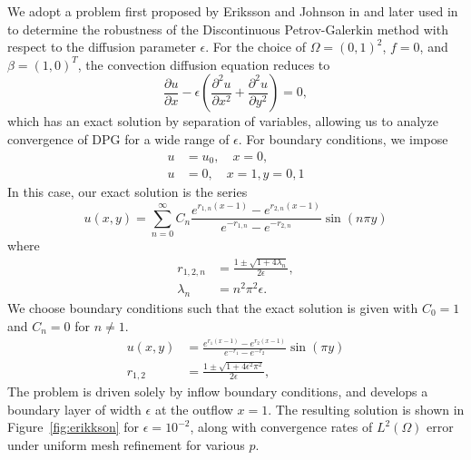 \documentclass[final,leqno]{siamltex}
\newcommand{\LRp}[1]{\left( #1 \right)}
\renewcommand{\L}{L^2\LRp{\Omega}}
\newcommand{\pd}[2]{\frac{\partial#1}{\partial#2}}
\newcommand{\pdd}[2]{\frac{\partial^2#1}{\partial#2^2}}
\begin{document}
We adopt a problem first proposed by Eriksson and Johnson in \cite{Eriksson1993} and later used in \cite{DPGrobustness, DPGrobustness2} to determine the robustness of the Discontinuous Petrov-Galerkin method with respect to the diffusion parameter $\epsilon$. For the choice of $\Omega = (0,1)^2$, $f=0$, and $\beta = (1,0)^T$, the convection diffusion equation reduces to
\[
\pd{u}{x} - \epsilon \left(\pdd{u}{x}+ \pdd{u}{y}\right) = 0,
\]
which has an exact solution by separation of variables, allowing us to analyze convergence of DPG for a wide range of $\epsilon$. For boundary conditions, we impose
\begin{align*}
u &= u_0, \quad x=0,\\
u &= 0, \quad x=1, y = 0,1
\end{align*}
In this case, our exact solution is the series
\[
u(x,y) = \sum_{n=0}^\infty C_n \frac{e^{r_{1,n}(x-1)} - e^{r_{2,n}(x-1)}}{e^{-r_{1,n}} - e^{-r_{2,n}}} \sin (n\pi y)
\]
where
\begin{align*}
r_{1,2,n} &= \frac{1 \pm \sqrt{1 + 4 \lambda_n}}{2 \epsilon},\\
\lambda_n &= n^2\pi^2 \epsilon.
\end{align*}
We choose boundary conditions such that the exact solution is given with $C_0 = 1$ and $C_n = 0$ for $n\neq 1$.  
\begin{align*}
u(x,y) &= \frac{e^{r_{1}(x-1)} - e^{r_{2}(x-1)}}{e^{-r_{1}} - e^{-r_{2}}} \sin (\pi y)\\
r_{1,2} &= \frac{1 \pm \sqrt{1 + 4 \epsilon^2 \pi^2}}{2 \epsilon},
\end{align*}
The problem is driven solely by inflow boundary conditions, and develops a boundary layer of width $\epsilon$ at the outflow $x = 1$.  
The resulting solution is shown in Figure~\ref{fig:erikkson} for $\epsilon = 10^{-2}$, along with convergence rates of $\L$ error under uniform mesh refinement for various $p$.  
\end{document}
